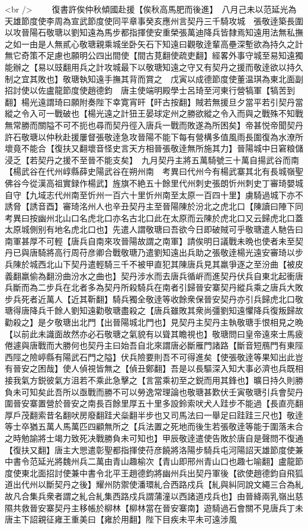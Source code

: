 <br />
　　復書許俟仲秋傾國赴援【俟秋高馬肥而後進】　八月己未以范延光為天雄節度使李周為宣武節度使同平章事癸亥應州言契丹三千騎攻城　張敬逹築長圍以攻晉陽石敬瑭以劉知遠為馬步都指揮使安重榮張萬迪降兵皆隸焉知遠用法無私撫之如一由是人無貳心敬瑭親乘城坐卧矢石下知遠曰觀敬逹輩高壘深塹欲為持久之計無它奇策不足慮也願明公四出間使【間古莧翻使疏吏翻】經畧外事守城至易知遠獨能辦之【易以豉翻用兵之計攻城最下以敬瑭知遠之守又有契丹之援而敬逹欲以持久制之宜其敗也】敬瑭執知遠手撫其背而賞之　戊寅以成德節度使董温琪為東北面副招討使以佐盧龍節度使趙德鈞　唐主使端明殿學士呂琦至河東行營犒軍【犒苦到翻】楊光遠謂琦曰願附奏陛下幸寛宵旰【旰古按翻】賊若無援旦夕當平若引契丹當縱之令入可一戰破也【楊光遠之計狃王晏球定州之勝欲縱之令入而與之戰殊不知戰無常勝而關隘不可不扼也尋而契丹徑入唐兵一戰而敗遂為所困矣】帝甚悦帝聞契丹許石敬瑭以仲秋赴援屢督張敬逹急攻晉陽不能下每有營構多值風雨長圍復為水潦所壞竟不能合【復扶又翻壞音怪史言天方相晉張敬逹無所施其力】晉陽城中日窘粮儲浸乏【若契丹之援不至晉不能支矣】　九月契丹主將五萬騎號三十萬自揚武谷而南【楊武谷在代州崞縣薛史陽武谷在朔州南　考異曰代州今有楊武寨其北有長城嶺聖佛谷今從漢高祖實録作楊武】旌旗不絶五十餘里代州刺史張朗忻州刺史丁審琦嬰城自守【九域志代州南至忻州一百六十里忻州南至太原一百四十里】虜騎過城下亦不誘脅【誘音酉】審琦洺州人也辛丑契丹主至晉陽陳於汾北之虎北口【陳讀曰陣下同　考異曰按幽州北山口名虎北口亦名古北口此在太原而云陳於虎北口又云歸虎北口蓋太原城側别有地名虎北口也】先遣人謂敬瑭曰吾欲今日即破賊可乎敬瑭遣人馳告曰南軍甚厚不可輕【唐兵自南來攻晉陽故謂之南軍】請俟明日議戰未晩也使者未至契丹已與唐騎將高行周苻彦卿合戰敬瑭乃遣劉知遠出兵助之張敬逹楊光遠安審琦以步兵陳於城西北山下契丹遣輕騎三千不被甲直犯其陳唐兵見其羸爭逐之至汾曲【被皮義翻羸偷為翻汾曲汾水之曲也】契丹涉水而去唐兵循㟁而進契丹伏兵自東北起衝唐兵斷而為二步兵在北者多為契丹所殺騎兵在南者引歸晉安寨契丹縱兵乘之唐兵大敗步兵死者近萬人【近其靳翻】騎兵獨全敬逹等收餘衆保晉安契丹亦引兵歸虎北口敬瑭得唐降兵千餘人劉知遠勸敬瑭盡殺之【唐兵雖敗其衆尚彊劉知遠懼降兵復叛歸故勸殺之】是夕敬瑭出北門【出晉陽城北門也】見契丹主契丹主執敬瑭手恨相見之晩【以前此未識面故然亦必石敬瑭之氣貌有以聳其瞻視也】敬瑭問曰皇帝遠來士馬疲倦遽與唐戰而大勝何也契丹主曰始吾自北來謂唐必斷雁門諸路【斷音短鴈門有東陘西陘之險嵉縣有陽武石門之隘】伏兵險要則吾不可得進矣【使張敬逹等果知出此豈有晉安之困哉】使人偵視皆無之【偵丑鄭翻】吾是以長驅深入知大事必濟也兵既相接我氣方鋭彼氣方沮若不乘此急擊之【言當乘初至之鋭而用其鋒也】曠日持久則勝負未可知矣此吾所以亟戰而勝不可以勞逸常理論也敬瑭甚歎伏壬寅敬瑭引兵會契丹圍晉安寨置營於晉安之南長百餘里厚五十里多設鈴索吠犬人跬步不能過【長直亮翻厚戶茂翻索昔名翻吠房廢翻跬犬橤翻半步也又司馬法曰一舉足曰跬跬三尺也】敬逹等士卒猶五萬人馬萬匹四顧無所之【兵法置之死地而後生若張敬逹等能于圍落未合之時勉諭將士竭力致死决戰勝負未可知也】甲辰敬逹遣使告敗於唐自是聲問不復通【復扶又翻】唐主大愳遣彰聖都指揮使苻彦饒將洛陽步騎兵屯河陽詔天雄節度使兼中書令范延光將魏州兵二萬由青山趣榆次【青山即邢州青山口也趣七喻翻】盧龍節度使東北面招討使兼中書令北平王趙德鈞將幽州兵出契丹軍後【欲使趙德鈞自飛狐道出代州以斷契丹之後】耀州防禦使潘環糺合西路戍兵【糺與糾同說文繩三合為糺故凡合集兵衆者謂之糺合糺集西路戍兵謂蒲潼以西諸道戍兵也】由晉絳兩乳嶺出慈隰共救晉安寨契丹主移帳於柳林【柳林當在晉安寨南】遊騎過石會關不見唐兵丁未唐主下詔親征雍王重美曰【雍於用翻】陛下目疾未平未可遠涉風